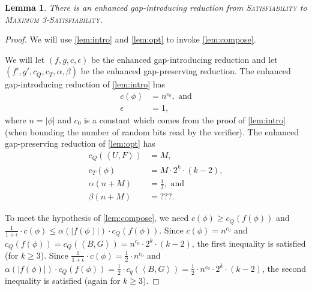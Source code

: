 \documentclass[]{article}
\theoremstyle{plain}
\newtheorem{lemma}{Lemma}
\theoremstyle{definition}
\newcommand{\pair}[2]{{\left\langle{#1}, {#2}\right\rangle}}
\begin{document}
\begin{lemma}\label{lem:gap3}
  There is an enhanced gap-introducing reduction from \textsc{Satisfiability} to \textsc{Maximum 3-Satisfiability}.
\end{lemma}
\begin{proof}
  We will use \autoref{lem:intro} and \autoref{lem:opt} to invoke \autoref{lem:compose}.

  We will let $(f, g, c, \epsilon)$ be the enhanced gap-introducing reduction and let $(f', g', c_Q, c_T, \alpha, \beta)$ be the enhanced gap-preserving reduction.
  The enhanced gap-introducing reduction of \autoref{lem:intro} has
  \begin{align*}
    c(\phi) & = n^{c_0}, \text{ and} \\
    \epsilon & = 1,
  \end{align*}
  where $n = |\phi|$ and $c_0$ is a constant which comes from the proof of \autoref{lem:intro} (when bounding the number of random bits read by the verifier).
  The enhanced gap-preserving reduction of \autoref{lem:opt} has
  \begin{align*}
    c_Q(\pair{U}{F}) & = M, \\
    c_T(\phi) & = M \cdot 2^k \cdot (k - 2), \\
    \alpha(n + M) & = \frac{1}{2}, \text{ and} \\
    \beta(n + M) & = ???.
  \end{align*}

  To meet the hypothesis of \autoref{lem:compose}, we need $c(\phi) \geq c_Q(f(\phi))$ and $\frac{1}{1 + \epsilon} \cdot c(\phi) \leq \alpha(|f(\phi)|) \cdot c_Q(f(\phi))$.
  Since $c(\phi) = n^{c_0}$ and $c_Q(f(\phi)) = c_Q(\pair{B}{G}) = n^{c_0} \cdot 2^k \cdot (k - 2)$, the first inequality is satisfied (for $k \geq 3$).
  Since $\frac{1}{1 + \epsilon} \cdot c(\phi) = \frac{1}{2} \cdot n^{c_0}$ and $\alpha(|f(\phi)|) \cdot c_Q(f(\phi)) = \frac{1}{2} \cdot c_q(\pair{B}{G}) = \frac{1}{2} \cdot n^{c_0} \cdot 2^k \cdot (k - 2)$, the second inequality is satisfied (again for $k \geq 3$).


\end{proof}
\end{document}
